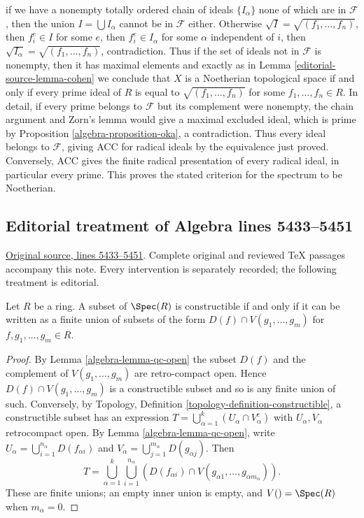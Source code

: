 \begin{example}
if we have a nonempty totally ordered chain of ideals
$\{I_\alpha\}$ none of which are in $\mathcal{F}$, then the union
$I = \bigcup I_\alpha$ cannot be in $\mathcal{F}$ either. Otherwise
$\sqrt{I} = \sqrt{(f_1, \ldots, f_n)}$, then $f_i^e \in I$ for some $e$,
then $f_i^e \in I_\alpha$ for some $\alpha$ independent of $i$, then
$\sqrt{I_\alpha} = \sqrt{(f_1, \ldots, f_n)}$, contradiction.
Thus if the set of ideals not in $\mathcal{F}$ is nonempty, then it
has maximal elements and
exactly as in Lemma \ref{editorial-source-lemma-cohen} we conclude that $X$ is a
Noetherian topological space if and only if every prime ideal of $R$
is equal to $\sqrt{(f_1, \ldots, f_n)}$ for some $f_1, \ldots, f_n \in R$.
In detail, if every prime belongs to $\mathcal F$ but its complement
were nonempty, the chain argument and Zorn's lemma would give a maximal
excluded ideal, which is prime by Proposition \ref{algebra-proposition-oka},
a contradiction. Thus every ideal belongs to $\mathcal F$, giving
ACC for radical ideals by the equivalence just proved.
Conversely, ACC gives the finite radical presentation of every radical
ideal, in particular every prime. This proves the stated criterion
for the spectrum to be Noetherian.
\end{example}


\subsection{Editorial treatment of Algebra lines 5433--5451}

\hypertarget{algebra-context-034}{}

\noindent\href{https://github.com/stacks/stacks-project/blob/a04446e57ec1fbc252a871afcec7752fb2807b14/algebra.tex\#L5433}{Original source, lines 5433--5451}. Complete original and reviewed TeX passages accompany this note. Every intervention is separately recorded; the following treatment is editorial.


\begin{lemma}
\label{editorial-source-lemma-constructible}
Let $R$ be a ring. A subset of $\Spec(R)$ is constructible if and only
if it can be written as a finite union of subsets of the form
$D(f) \cap V(g_1, \ldots, g_m)$ for $f, g_1, \ldots, g_m \in R$.
\end{lemma}

\begin{proof}
By Lemma \ref{algebra-lemma-qc-open} the subset $D(f)$ and the complement of
$V(g_1, \ldots, g_m)$ are retro-compact open. Hence
$D(f) \cap V(g_1, \ldots, g_m)$ is a constructible subset and so is
any finite union of such. Conversely, by Topology, Definition
\ref{topology-definition-constructible}, a constructible subset has an
expression $T=\bigcup_{\alpha=1}^k(U_\alpha\cap V_\alpha^c)$ with
$U_\alpha,V_\alpha$ retrocompact open. By Lemma \ref{algebra-lemma-qc-open}, write
$U_\alpha=\bigcup_{i=1}^{n_\alpha}D(f_{\alpha i})$ and
$V_\alpha=\bigcup_{j=1}^{m_\alpha}D(g_{\alpha j})$. Then
$$
T=\bigcup_{\alpha=1}^k\bigcup_{i=1}^{n_\alpha}
\left(D(f_{\alpha i})\cap
V(g_{\alpha1},\ldots,g_{\alpha m_\alpha})\right).
$$
These are finite unions; an empty inner union is empty, and
$V()=\Spec(R)$ when $m_\alpha=0$.
\end{proof}


